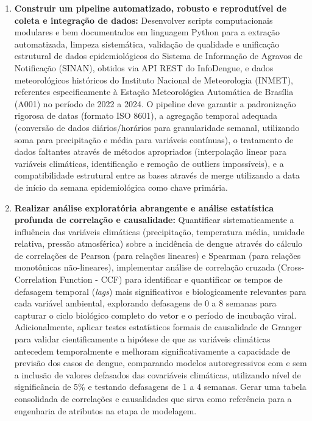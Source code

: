 \begin{enumerate}
    \item \textbf{Construir um pipeline automatizado, robusto e reprodutível de coleta e integração de dados:} Desenvolver scripts computacionais modulares e bem documentados em linguagem Python para a extração automatizada, limpeza sistemática, validação de qualidade e unificação estrutural de dados epidemiológicos do Sistema de Informação de Agravos de Notificação (SINAN), obtidos via API REST do InfoDengue, e dados meteorológicos históricos do Instituto Nacional de Meteorologia (INMET), referentes especificamente à Estação Meteorológica Automática de Brasília (A001) no período de 2022 a 2024. O pipeline deve garantir a padronização rigorosa de datas (formato ISO 8601), a agregação temporal adequada (conversão de dados diários/horários para granularidade semanal, utilizando soma para precipitação e média para variáveis contínuas), o tratamento de dados faltantes através de métodos apropriados (interpolação linear para variáveis climáticas, identificação e remoção de outliers impossíveis), e a compatibilidade estrutural entre as bases através de merge utilizando a data de início da semana epidemiológica como chave primária.
    
    \item \textbf{Realizar análise exploratória abrangente e análise estatística profunda de correlação e causalidade:} Quantificar sistematicamente a influência das variáveis climáticas (precipitação, temperatura média, umidade relativa, pressão atmosférica) sobre a incidência de dengue através do cálculo de correlações de Pearson (para relações lineares) e Spearman (para relações monotônicas não-lineares), implementar análise de correlação cruzada (Cross-Correlation Function - CCF) para identificar e quantificar os tempos de defasagem temporal (\textit{lags}) mais significativos e biologicamente relevantes para cada variável ambiental, explorando defasagens de 0 a 8 semanas para capturar o ciclo biológico completo do vetor e o período de incubação viral. Adicionalmente, aplicar testes estatísticos formais de causalidade de Granger para validar cientificamente a hipótese de que as variáveis climáticas antecedem temporalmente e melhoram significativamente a capacidade de previsão dos casos de dengue, comparando modelos autoregressivos com e sem a inclusão de valores defasados das covariáveis climáticas, utilizando nível de significância de 5\% e testando defasagens de 1 a 4 semanas. Gerar uma tabela consolidada de correlações e causalidades que sirva como referência para a engenharia de atributos na etapa de modelagem.
    

\end{enumerate}
